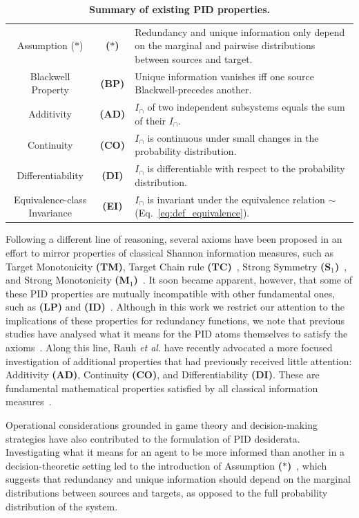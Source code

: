 \documentclass{article}
\makeatletter
\newcommand{\etal}{\textit{et al.\@} }
\newcommand{\ts}[1]{\ensuremath{_{\text{#1}}}}
\newcommand{\Ic}{\ensuremath{I_\cap}\xspace}
\newcommand{\ID}{\textbf{(ID)}\xspace} %
\newcommand{\TM}{\textbf{(TM)}\xspace} %
\newcommand{\TC}{\textbf{(TC)}\xspace} %
\newcommand{\So}{\textbf{(S\ts{1})}\xspace} %
\newcommand{\Mo}{\textbf{(M\ts{1})}\xspace} %
\newcommand{\BP}{\textbf{(BP)}\xspace} %
\newcommand{\AST}{\textbf{($\boldsymbol{\ast}$)}\xspace} %
\newcommand{\AD}{\textbf{(AD)}\xspace} %
\newcommand{\CO}{\textbf{(CO)}\xspace} %
\newcommand{\EI}{\textbf{(EI)}\xspace} %
\newcommand{\LP}{\textbf{(LP)}\xspace}
\newcommand{\DI}{\textbf{(DI)}\xspace}
\newenvironment{DIFnomarkup}{}
\makeatother
\begin{document}
\begin{DIFnomarkup}
\begin{table}[t]
\begin{tabularx}{\textwidth}{c c >{\centering\arraybackslash}X}
        Assumption ($\ast$) & \AST & Redundancy and unique information only depend on the marginal and pairwise distributions between sources and target.\\
        Blackwell Property & \BP & Unique information vanishes iff one source Blackwell-precedes another. \\
        Additivity & \AD & \Ic of two independent subsystems equals the sum of their \Ic. \\
        Continuity & \CO & \Ic is continuous under small changes in the probability distribution. \\
        Differentiability & \DI & \Ic is differentiable with respect to the probability distribution. \\
        Equivalence-class Invariance & \EI & \Ic is invariant under the equivalence relation $\sim$ (Eq.~\eqref{eq:def_equivalence}). \\
         \bottomrule
    \end{tabularx}
    \caption{\textbf{Summary of existing PID properties.}}
    \label{tab:property_summary}
\end{table}
\end{DIFnomarkup}


Following a different line of reasoning, several axioms have been proposed in an effort to mirror properties of classical Shannon information measures, such as Target Monotonicity \TM, Target Chain rule \TC~\cite{bertschinger2013shared, finn2018pointwise, makkeh2021introducing}, Strong Symmetry \So~\cite{bertschinger2013shared}, and Strong Monotonicity \Mo~\cite{griffith2014intersection}. It soon became apparent, however, that some of these PID properties are mutually incompatible with other fundamental ones, such as \LP and \ID~\cite{rauh2014reconsidering, matthias2025novel}. Although in this work we restrict our attention to the implications of these properties for redundancy functions, we note that previous studies have analysed what it means for the PID atoms themselves to satisfy the axioms~\cite{banerjee2015synergy, rauh2014reconsidering, rauh2017extractable}. Along this line, Rauh \etal have recently advocated a more focused investigation of additional properties that had previously received little attention: Additivity \AD, Continuity \CO, and Differentiability \DI. These are fundamental mathematical properties satisfied by all classical information measures~\cite{rauh2023continuity}. 

Operational considerations grounded in game theory and decision-making strategies have also contributed to the formulation of PID desiderata. Investigating what it means for an agent to be more informed than another in a decision-theoretic setting led to the introduction of Assumption \AST~\cite{bertschinger2014quantifying}, which suggests that redundancy and unique information should depend on the marginal distributions between sources and targets, as opposed to the full probability distribution of the system.
\end{document}
